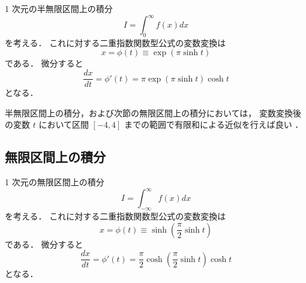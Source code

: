 1 次元の半無限区間上の積分
\begin{equation}
    I = \int_{0}^{\infty} f(x) dx
\end{equation}
を考える．
これに対する二重指数関数型公式の変数変換は
\begin{equation}
    x = \phi(t) \equiv \exp(\pi \sinh{t})
\end{equation}
である\cite[Section 4.5.3]{Press2007}．
微分すると
\begin{equation}
    \frac{dx}{dt} = \phi'(t)
    = \pi \exp(\pi \sinh{t}) \cosh{t}
\end{equation}
となる．

半無限区間上の積分，および次節の無限区間上の積分においては，
変数変換後の変数 $t$ において区間 $[-4, 4]$ までの範囲で有限和による近似を行えば良い
\cite[4.5.3]{Press2007}．

\subsection{無限区間上の積分}

1 次元の無限区間上の積分
\begin{equation}
    I = \int_{-\infty}^{\infty} f(x) dx
\end{equation}
を考える．
これに対する二重指数関数型公式の変数変換は
\begin{equation}
    x = \phi(t) \equiv \sinh \left(\frac{\pi}{2} \sinh{t}\right)
\end{equation}
である\cite[Section 4.5.3]{Press2007}．
微分すると
\begin{equation}
    \frac{dx}{dt} = \phi'(t)
    = \frac{\pi}{2} \cosh \left(\frac{\pi}{2} \sinh{t}\right) \cosh{t}
\end{equation}
となる．
